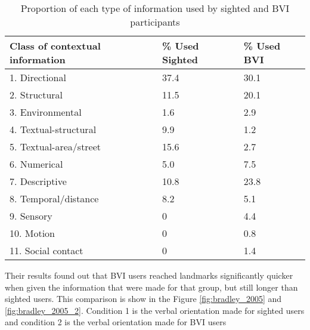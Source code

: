\begin{table}[htbp]
    \centering
    \caption{Proportion of each type of information used by sighted and BVI participants \cite{bradley2005experimental}}
    \begin{tabular}{|l|l|l|}
        \hline
        \textbf{Class of contextual information} & \textbf{\% Used Sighted} & \textbf{\% Used BVI} \\ \hline
        1. Directional                           & 37.4                     & 30.1                 \\ \hline
        2. Structural                            & 11.5                     & 20.1                 \\ \hline
        3. Environmental                         & 1.6                      & 2.9                  \\ \hline
        4. Textual-structural                    & 9.9                      & 1.2                  \\ \hline
        5. Textual-area/street                   & 15.6                     & 2.7                  \\ \hline
        6. Numerical                             & 5.0                      & 7.5                  \\ \hline
        7. Descriptive                           & 10.8                     & 23.8                 \\ \hline
        8. Temporal/distance                     & 8.2                      & 5.1                  \\ \hline
        9. Sensory                               & 0                        & 4.4                  \\ \hline
        10. Motion                               & 0                        & 0.8                  \\ \hline
        11. Social contact                       & 0                        & 1.4                  \\ \hline
    \end{tabular}
    \label{tab:bradley_2005_table}
\end{table}

Their results found out that BVI users reached landmarks significantly quicker when given the information that were made for that group, but still longer than sighted users. This comparison is show in the Figure \ref{fig:bradley_2005} and \ref{fig:bradley_2005_2}. Condition 1 is the verbal orientation made for sighted users and condition 2 is the verbal orientation made for BVI users

